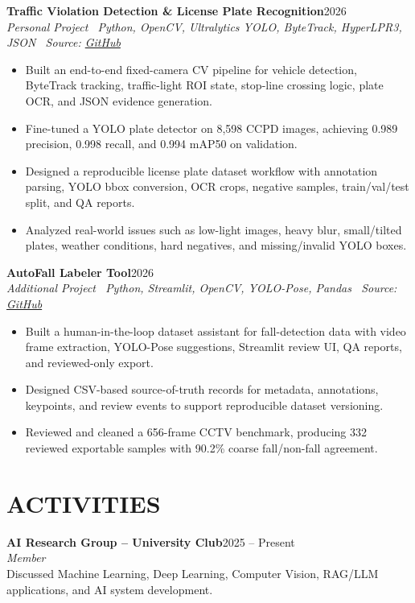 \documentclass[10pt,a4paper]{article}
\newenvironment{cvitems}{%
    \begin{itemize}[leftmargin=1.2em,itemsep=0pt,topsep=1pt,parsep=0pt]
}{%
    \end{itemize}
}
\newcommand{\entryhead}[2]{%
    \noindent\textbf{#1}\hfill #2\\[-2pt]
}
\newcommand{\entrysub}[1]{%
    \noindent\textit{#1}\\[-1pt]
}
\begin{document}
\entryhead{Traffic Violation Detection \& License Plate Recognition}{2026}
\entrysub{Personal Project \textbar\ Python, OpenCV, Ultralytics YOLO, ByteTrack, HyperLPR3, JSON \textbar\ Source: \href{https://github.com/NguyenKhacBao564/Traffic-Violation-Detection-and-License-Plate-Recognition}{GitHub}}
\begin{cvitems}
    \item Built an end-to-end fixed-camera CV pipeline for vehicle detection, ByteTrack tracking, traffic-light ROI state, stop-line crossing logic, plate OCR, and JSON evidence generation.
    \item Fine-tuned a YOLO plate detector on 8,598 CCPD images, achieving 0.989 precision, 0.998 recall, and 0.994 mAP50 on validation.
    \item Designed a reproducible license plate dataset workflow with annotation parsing, YOLO bbox conversion, OCR crops, negative samples, train/val/test split, and QA reports.
    \item Analyzed real-world issues such as low-light images, heavy blur, small/tilted plates, weather conditions, hard negatives, and missing/invalid YOLO boxes.
\end{cvitems}

\entryhead{AutoFall Labeler Tool}{2026}
\entrysub{Additional Project \textbar\ Python, Streamlit, OpenCV, YOLO-Pose, Pandas \textbar\ Source: \href{https://github.com/NguyenKhacBao564/autofall-labeler-tool}{GitHub}}
\begin{cvitems}
    \item Built a human-in-the-loop dataset assistant for fall-detection data with video frame extraction, YOLO-Pose suggestions, Streamlit review UI, QA reports, and reviewed-only export.
    \item Designed CSV-based source-of-truth records for metadata, annotations, keypoints, and review events to support reproducible dataset versioning.
    \item Reviewed and cleaned a 656-frame CCTV benchmark, producing 332 reviewed exportable samples with 90.2\% coarse fall/non-fall agreement.
\end{cvitems}

\section{ACTIVITIES}
\entryhead{AI Research Group -- University Club}{2025 -- Present}
\entrysub{Member}
Discussed Machine Learning, Deep Learning, Computer Vision, RAG/LLM applications, and AI system development.
\end{document}
